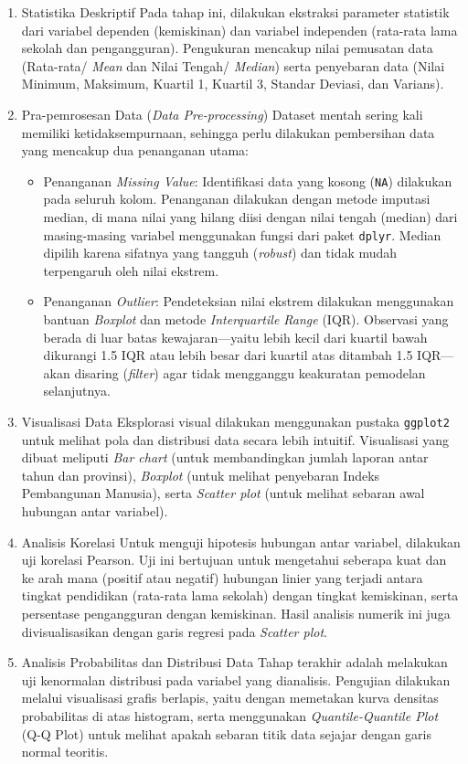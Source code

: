 \documentclass[
]{article}
\begin{document}
\begin{enumerate}
\def\labelenumi{\arabic{enumi}.}
\item
  Statistika Deskriptif Pada tahap ini, dilakukan ekstraksi parameter
  statistik dari variabel dependen (kemiskinan) dan variabel independen
  (rata-rata lama sekolah dan pengangguran). Pengukuran mencakup nilai
  pemusatan data (Rata-rata/ \emph{Mean} dan Nilai Tengah/
  \emph{Median}) serta penyebaran data (Nilai Minimum, Maksimum, Kuartil
  1, Kuartil 3, Standar Deviasi, dan Varians).
\item
  Pra-pemrosesan Data (\emph{Data Pre-processing}) Dataset mentah sering
  kali memiliki ketidaksempurnaan, sehingga perlu dilakukan pembersihan
  data yang mencakup dua penanganan utama:

  \begin{itemize}
  \item
    Penanganan \emph{Missing Value}: Identifikasi data yang kosong
    (\texttt{NA}) dilakukan pada seluruh kolom. Penanganan dilakukan
    dengan metode imputasi median, di mana nilai yang hilang diisi
    dengan nilai tengah (median) dari masing-masing variabel menggunakan
    fungsi dari paket \texttt{dplyr}. Median dipilih karena sifatnya
    yang tangguh (\emph{robust}) dan tidak mudah terpengaruh oleh nilai
    ekstrem.
  \item
    Penanganan \emph{Outlier}: Pendeteksian nilai ekstrem dilakukan
    menggunakan bantuan \emph{Boxplot} dan metode \emph{Interquartile
    Range} (IQR). Observasi yang berada di luar batas kewajaran---yaitu
    lebih kecil dari kuartil bawah dikurangi 1.5 IQR atau lebih besar
    dari kuartil atas ditambah 1.5 IQR---akan disaring (\emph{filter})
    agar tidak mengganggu keakuratan pemodelan selanjutnya.
  \end{itemize}
\item
  Visualisasi Data Eksplorasi visual dilakukan menggunakan pustaka
  \texttt{ggplot2} untuk melihat pola dan distribusi data secara lebih
  intuitif. Visualisasi yang dibuat meliputi \emph{Bar chart} (untuk
  membandingkan jumlah laporan antar tahun dan provinsi), \emph{Boxplot}
  (untuk melihat penyebaran Indeks Pembangunan Manusia), serta
  \emph{Scatter plot} (untuk melihat sebaran awal hubungan antar
  variabel).
\item
  Analisis Korelasi Untuk menguji hipotesis hubungan antar variabel,
  dilakukan uji korelasi Pearson. Uji ini bertujuan untuk mengetahui
  seberapa kuat dan ke arah mana (positif atau negatif) hubungan linier
  yang terjadi antara tingkat pendidikan (rata-rata lama sekolah) dengan
  tingkat kemiskinan, serta persentase pengangguran dengan kemiskinan.
  Hasil analisis numerik ini juga divisualisasikan dengan garis regresi
  pada \emph{Scatter plot}.
\item
  Analisis Probabilitas dan Distribusi Data Tahap terakhir adalah
  melakukan uji kenormalan distribusi pada variabel yang dianalisis.
  Pengujian dilakukan melalui visualisasi grafis berlapis, yaitu dengan
  memetakan kurva densitas probabilitas di atas histogram, serta
  menggunakan \emph{Quantile-Quantile Plot} (Q-Q Plot) untuk melihat
  apakah sebaran titik data sejajar dengan garis normal teoritis.
\end{enumerate}
\end{document}
